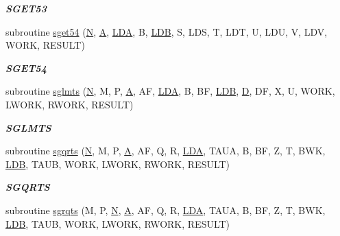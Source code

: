 \begin{DoxyCompactItemize}
\begin{DoxyCompactList}\small\item\em {\bfseries S\+G\+E\+T53} \end{DoxyCompactList}\item 
subroutine \hyperlink{group__single__eig_ga445a7d10a693e781798a410681ab92a6}{sget54} (\hyperlink{polmisc_8c_a0240ac851181b84ac374872dc5434ee4}{N}, \hyperlink{classA}{A}, \hyperlink{example__user_8c_ae946da542ce0db94dced19b2ecefd1aa}{L\+D\+A}, B, \hyperlink{example__user_8c_a50e90a7104df172b5a89a06c47fcca04}{L\+D\+B}, S, L\+D\+S, T, L\+D\+T, U, L\+D\+U, V, L\+D\+V, W\+O\+R\+K, R\+E\+S\+U\+L\+T)
\begin{DoxyCompactList}\small\item\em {\bfseries S\+G\+E\+T54} \end{DoxyCompactList}\item 
subroutine \hyperlink{group__single__eig_gaa51af534646f9b5375c14c87ededdfbd}{sglmts} (\hyperlink{polmisc_8c_a0240ac851181b84ac374872dc5434ee4}{N}, M, P, \hyperlink{classA}{A}, A\+F, \hyperlink{example__user_8c_ae946da542ce0db94dced19b2ecefd1aa}{L\+D\+A}, B, B\+F, \hyperlink{example__user_8c_a50e90a7104df172b5a89a06c47fcca04}{L\+D\+B}, \hyperlink{odrpack_8h_a7dae6ea403d00f3687f24a874e67d139}{D}, D\+F, X, U, W\+O\+R\+K, L\+W\+O\+R\+K, R\+W\+O\+R\+K, R\+E\+S\+U\+L\+T)
\begin{DoxyCompactList}\small\item\em {\bfseries S\+G\+L\+M\+T\+S} \end{DoxyCompactList}\item 
subroutine \hyperlink{group__single__eig_ga412f58b485b08b55197171f8c070dcee}{sgqrts} (\hyperlink{polmisc_8c_a0240ac851181b84ac374872dc5434ee4}{N}, M, P, \hyperlink{classA}{A}, A\+F, Q, R, \hyperlink{example__user_8c_ae946da542ce0db94dced19b2ecefd1aa}{L\+D\+A}, T\+A\+U\+A, B, B\+F, Z, T, B\+W\+K, \hyperlink{example__user_8c_a50e90a7104df172b5a89a06c47fcca04}{L\+D\+B}, T\+A\+U\+B, W\+O\+R\+K, L\+W\+O\+R\+K, R\+W\+O\+R\+K, R\+E\+S\+U\+L\+T)
\begin{DoxyCompactList}\small\item\em {\bfseries S\+G\+Q\+R\+T\+S} \end{DoxyCompactList}\item 
subroutine \hyperlink{group__single__eig_ga38549b2e96321b31dceb6b549fba78dc}{sgrqts} (M, P, \hyperlink{polmisc_8c_a0240ac851181b84ac374872dc5434ee4}{N}, \hyperlink{classA}{A}, A\+F, Q, R, \hyperlink{example__user_8c_ae946da542ce0db94dced19b2ecefd1aa}{L\+D\+A}, T\+A\+U\+A, B, B\+F, Z, T, B\+W\+K, \hyperlink{example__user_8c_a50e90a7104df172b5a89a06c47fcca04}{L\+D\+B}, T\+A\+U\+B, W\+O\+R\+K, L\+W\+O\+R\+K, R\+W\+O\+R\+K, R\+E\+S\+U\+L\+T)

\end{DoxyCompactItemize}
